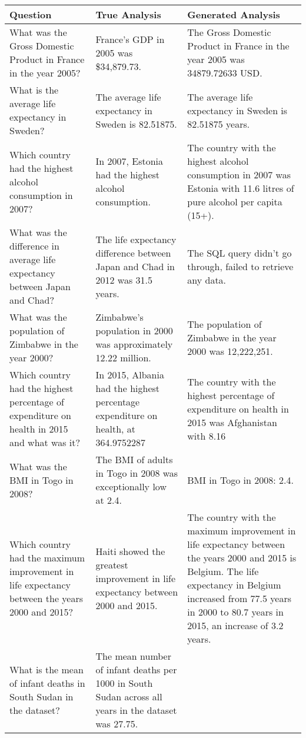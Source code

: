 \documentclass[11pt]{article}
\begin{document}
\begin{table*}[t]
\centering
\begin{tabular}{|p{}|p{}|p{}|}
\hline
\textbf{Question} & \textbf{True Analysis} & \textbf{Generated Analysis} \\ \hline
What was the Gross Domestic Product in France in the year 2005? & 
France's GDP in 2005 was \$34,879.73. & 
The Gross Domestic Product in France in the year 2005 was 34879.72633 USD. \\ \hline
What is the average life expectancy in Sweden? & 
The average life expectancy in Sweden is 82.51875. & 
The average life expectancy in Sweden is 82.51875 years. \\ \hline
Which country had the highest alcohol consumption in 2007? & 
In 2007, Estonia had the highest alcohol consumption. & 
The country with the highest alcohol consumption in 2007 was Estonia with 11.6 litres of pure alcohol per capita (15+). \\ \hline
What was the difference in average life expectancy between Japan and Chad? & 
The life expectancy difference between Japan and Chad in 2012 was 31.5 years. & 
The SQL query didn't go through, failed to retrieve any data. \\ \hline
What was the population of Zimbabwe in the year 2000? & 
Zimbabwe’s population in 2000 was approximately 12.22 million. & 
The population of Zimbabwe in the year 2000 was 12,222,251. \\ \hline
Which country had the highest percentage of expenditure on health in 2015 and what was it? & 
In 2015, Albania had the highest percentage expenditure on health, at 364.9752287%
& 
The country with the highest percentage of expenditure on health in 2015 was Afghanistan with 8.16%
\\ \hline
What was the BMI in Togo in 2008? & 
The BMI of adults in Togo in 2008 was exceptionally low at 2.4. & 
BMI in Togo in 2008: 2.4. \\ \hline
Which country had the maximum improvement in life expectancy between the years 2000 and 2015? & 
Haiti showed the greatest improvement in life expectancy between 2000 and 2015. & 
The country with the maximum improvement in life expectancy between the years 2000 and 2015 is Belgium. The life expectancy in Belgium increased from 77.5 years in 2000 to 80.7 years in 2015, an increase of 3.2 years. \\ \hline
What is the mean of infant deaths in South Sudan in the dataset? & 
The mean number of infant deaths per 1000 in South Sudan across all years in the dataset was 27.75. & 

\end{tabular}
\end{table*}
\end{document}
